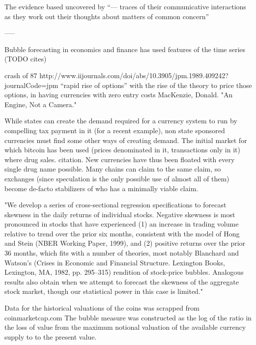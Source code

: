 The evidence based uncovered by “— traces of their communicative interactions as they work out their thoughts about matters of common concern” 



-----


Bubble forecasting in economics and finance has used features of the time series (TODO cites)


crash of 87 http://www.iijournals.com/doi/abs/10.3905/jpm.1989.409242?journalCode=jpm “rapid rise of options” with the rise of the theory to price those options, in having currencies with zero entry costs
MacKenzie, Donald. "An Engine, Not a Camera."

While states can create the demand required for a currency system to run by compelling tax payment in it (for a recent example), non state sponsored currencies must find some other ways of creating demand.
The initial market for which bitcoin has been used (prices denominated in it, transactions only in it) where drug sales. citation.
New currencies have thus been floated with every single drug name possible. Many chains can claim to the same claim, so exchanges (since speculation is the only possible use of almost all of them) become de-facto stabilizers of who has a minimally viable claim. 


"We develop a series of cross-sectional regression specifications to forecast skewness in the daily returns of individual stocks. Negative skewness is most pronounced in stocks that have experienced (1) an increase in trading volume relative to trend over the prior six months, consistent with the model of Hong and Stein (NBER Working Paper, 1999), and (2) positive returns over the prior 36 months, which fits with a number of theories, most notably Blanchard and Watson's (Crises in Economic and Financial Structure. Lexington Books, Lexington, MA, 1982, pp. 295–315) rendition of stock-price bubbles. Analogous results also obtain when we attempt to forecast the skewness of the aggregate stock market, though our statistical power in this case is limited."






Data for the historical valuations of the coins was scrapped from coinmarketcap.com The bubble measure was constructed as the log of the ratio in the loss of value from the maximum notional valuation of the available currency supply to to the present value. 

